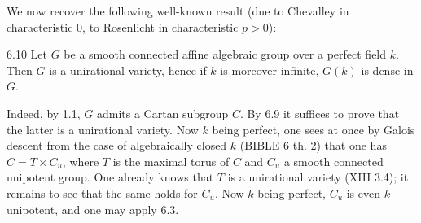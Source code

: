 We now recover
the following
well-known result
(due to Chevalley
in characteristic
$0$, to Rosenlicht
in characteristic
$p>0$):
\begin{corollary}{6.10}\label{XIV.6.10}
Let $G$ be a smooth
connected affine
algebraic group over
a perfect field $k$.
Then $G$ is a
unirational variety,
hence if $k$ is
moreover infinite,
$G(k)$ is dense
in $G$.
\end{corollary}
Indeed, by 1.1,
$G$ admits a Cartan
subgroup $C$. By
6.9 it suffices
to prove that the
latter is a
unirational variety.
Now $k$ being
perfect, one sees
at once by Galois
descent from the
case of algebraically
closed $k$ (BIBLE
6 th. 2) that
one has $C=T\times C_u$,
where $T$ is the
maximal torus of
$C$ and $C_u$
a smooth connected
unipotent group.
One already knows
that $T$ is a
unirational variety
(XIII 3.4); it
remains to see
that the same
holds for $C_u$.
Now $k$ being
perfect, $C_u$ is
even $k$-unipotent,
and one may
apply 6.3.

